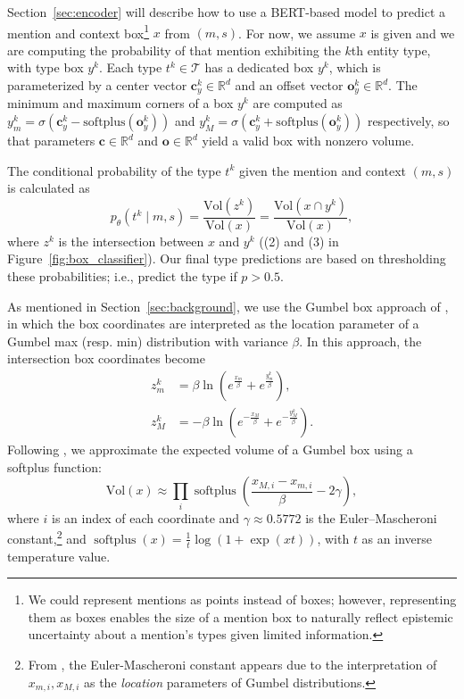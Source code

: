 \documentclass[11pt,a4paper]{article}
\begin{document}
Section~\ref{sec:encoder} will describe how to use a BERT-based model to predict a mention and context box\footnote{We could represent mentions as points instead of boxes; however, representing them as boxes enables the size of a mention box to naturally reflect epistemic uncertainty about a mention's types given limited information.} $x$ from $(m, s)$. For now, we assume $x$ is given and we are computing the probability of that mention exhibiting the $k$th entity type, with type box $y^k$. Each type $t^k \in \mathcal{T}$ has a dedicated box $y^k$, which is parameterized by a center vector $\mathbf{c}_y^k \in \mathbb{R}^{d}$ and an offset vector $\mathbf{o}_y^k \in \mathbb{R}^{d}$. The minimum and maximum corners of a box $y^k$ are computed as $y_m^k = \sigma(\mathbf{c}_y^k - \text{softplus}(\mathbf{o}_y^k))$ and $y_M^k = \sigma(\mathbf{c}_y^k + \text{softplus}(\mathbf{o}_y^k))$ respectively, so that parameters $\mathbf{c} \in \mathbb{R}^d$ and $\mathbf{o} \in \mathbb{R}^d$ yield a valid box with nonzero volume.


The conditional probability of the type $t^k$ given the mention and context $(m, s)$ is calculated as
\begin{equation*}
p_\theta(t^k \mid m, s) = \frac{\text{Vol}(z^k)}{\text{Vol}(x)} = \frac{\text{Vol}(x \cap y^k)}{\text{Vol}(x)},
\end{equation*}
where $z^k$ is the intersection between $x$ and $y^k$ ((2) and (3) in Figure~\ref{fig:box_classifier}). Our final type predictions are based on thresholding these probabilities; i.e., predict the type if $p > 0.5$. 

As mentioned in Section~\ref{sec:background}, we use the Gumbel box approach of \citet{Shib_Sankar_Dasgupta_20}, in which the box coordinates are interpreted as the location parameter of a Gumbel max (resp. min) distribution with variance $\beta$. In this approach, the intersection box coordinates become
\begin{equation*} \label{eq:gumbel_min_max}
\begin{aligned}
z_m^k &=  \beta \ln \left(e^{\frac{x_m}{\beta}} + e^{\frac{y^k_m}{\beta}}\right),\\
z_M^k &= - \beta \ln \left(e^{-\frac{x_M}{\beta}} + e^{-\frac{y^k_M}{\beta}}\right).
\end{aligned}
\end{equation*}
Following \citet{Shib_Sankar_Dasgupta_20}, we approximate the expected volume of a Gumbel box using a softplus function:
\begin{equation*}
\text{Vol}(x) \approx \prod_{i} \operatorname{softplus}\left(\frac{x_{M,i} - x_{m,i}}{\beta} - 2 \gamma\right),
\end{equation*}
where $i$ is an index of each coordinate and  $\gamma\approx 0.5772$ is the Euler–Mascheroni constant,\footnote{From \citet{Shib_Sankar_Dasgupta_20}, the Euler-Mascheroni constant appears due to the interpretation of $x_{m,i}, x_{M,i}$ as the \textit{location} parameters of Gumbel distributions.} and $\operatorname{softplus}(x) = \frac{1}{t} \log(1 + \exp(x t))$, with $t$ as an inverse temperature value.
\end{document}
